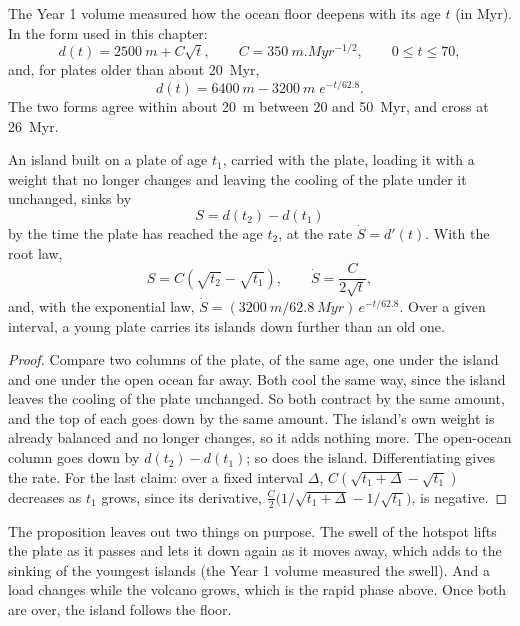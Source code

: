 The Year 1 volume measured how the ocean floor deepens with its age $t$ (in \unit{Myr}). In the
form used in this chapter:
\[
d(t) = \qty{2500}{m} + C\sqrt{t}, \qquad C = \qty{350}{m.Myr^{-1/2}}, \qquad 0 \le t \le 70,
\]
and, for plates older than about \qty{20}{Myr},
\[
d(t) = \qty{6400}{m} - \qty{3200}{m}\; e^{-t/62.8}.
\]
The two forms agree within about \qty{20}{m} between 20 and \qty{50}{Myr}, and cross at
\qty{26}{Myr}.

\begin{proposition}\label{prop:b2:oceanic-islands:sinking}
An island built on a plate of age $t_1$, carried with the plate, loading it with a weight that
no longer changes and leaving the cooling of the plate under it unchanged, sinks by
\[
S = d(t_2) - d(t_1)
\]
by the time the plate has reached the age $t_2$, at the rate $\dot S = d'(t)$. With the root law,
\[
S = C\left(\sqrt{t_2} - \sqrt{t_1}\right), \qquad \dot S = \frac{C}{2\sqrt t},
\]
and, with the exponential law, $\dot S = (\qty{3200}{m}/\qty{62.8}{Myr})\,e^{-t/62.8}$. Over a
given interval, a young plate carries its islands down further than an old one.
\end{proposition}

\begin{proof}
Compare two columns of the plate, of the same age, one under the island and one under the open
ocean far away. Both cool the same way, since the island leaves the cooling of the plate unchanged. So both contract by the same amount, and the top of each goes down by the same
amount. The island's own weight is already balanced and no longer changes, so it adds nothing
more. The open-ocean column goes down by $d(t_2) - d(t_1)$; so does the island. Differentiating
gives the rate. For the last claim: over a fixed interval $\Delta$, $C(\sqrt{t_1 + \Delta} -
\sqrt{t_1})$ decreases as $t_1$ grows, since its derivative, $\frac C2\bigl(1/\sqrt{t_1 + \Delta}
- 1/\sqrt{t_1}\bigr)$, is negative.
\end{proof}

The proposition leaves out two things on purpose. The swell of the hotspot lifts the plate as it
passes and lets it down again as it moves away, which adds to the sinking of the youngest islands
(the Year 1 volume measured the swell). And a load changes while the volcano grows, which is the
rapid phase above. Once both are over, the island follows the floor.

